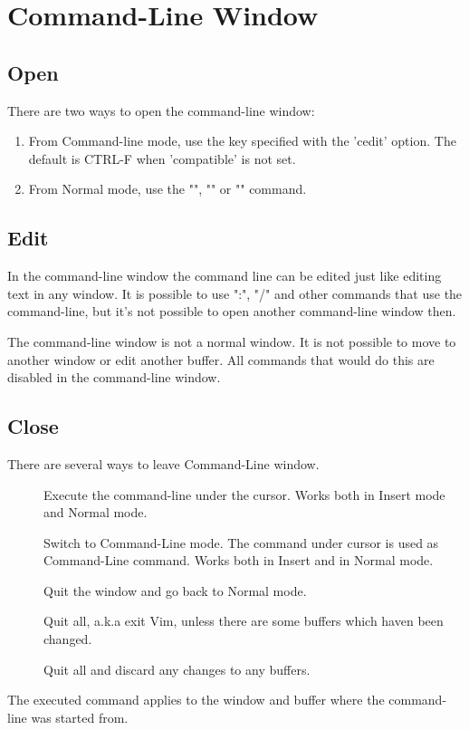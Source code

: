 \documentclass{article}
\newcommand{\syntax}[1]{\PVerb{#1}}
\newcommand{\command}[1]{\PVerb{#1}}
\begin{document}
\section{Command-Line Window}
\subsection{Open}
There are two ways to open the command-line window:
\begin{enumerate}
  \item From Command-line mode, use the key specified with the 'cedit' option.
    The default is CTRL-F when 'compatible' is not set.
  \item From Normal mode, use the "\command{q:}", "\command{q/}" or "\command{q?}" command.
\end{enumerate}

\subsection{Edit}
In the command-line window the command line can be edited just like editing
text in any window.
It is possible to use ":", "/" and other commands that use the command-line,
but it's not possible to open another command-line window then.

The command-line window is not a normal window.  It is not possible to move to
another window or edit another buffer.  All commands that would do this are
disabled in the command-line window.

\subsection{Close}
There are several ways to leave Command-Line window.
\begin{description}
  \item[\syntax{<CR>}] 
Execute the command-line under the cursor.  Works both in Insert mode and Normal mode.
  \item[\syntax{<C-c>}] Switch to Command-Line mode. The command under cursor is used as Command-Line command. Works both in Insert and in Normal mode.
  \item[\syntax{:close}] 
  \item[\syntax{:q[uit]}] Quit the window and go back to Normal mode.
  \item[\syntax{:qa[ll]}] Quit all, a.k.a exit Vim, unless there are some buffers which haven been changed.
  \item[\syntax{:qa[ll]!}] Quit all and discard any changes to any buffers.
\end{description}
The executed command applies to the window and buffer where the command-line was started from.
\end{document}
